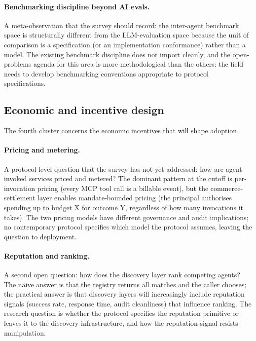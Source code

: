 \paragraph{Benchmarking discipline beyond AI evals.}
A meta-observation that the survey should record:
the inter-agent benchmark space is structurally
different from the LLM-evaluation space because
the unit of comparison is a specification (or an
implementation conformance) rather than a model. The
existing benchmark discipline does not import cleanly,
and the open-problems agenda for this area is more
methodological than the others: the field needs to
develop benchmarking conventions appropriate to
protocol specifications.

\subsection{Economic and incentive design}
\label{sec:openproblems:economic}

The fourth cluster concerns the economic incentives
that will shape adoption.

\paragraph{Pricing and metering.}
A protocol-level question that the survey has
not yet addressed: how are agent-invoked services
priced and metered? The dominant pattern at the
cutoff is per-invocation pricing
(every MCP tool call is a billable event), but
the commerce-settlement layer enables mandate-bounded
pricing (the principal authorises spending up to
budget X for outcome Y, regardless of how many
invocations it takes). The two pricing models
have different governance and audit implications;
no contemporary protocol specifies which model the
protocol assumes, leaving the question to
deployment.

\paragraph{Reputation and ranking.}
A second open question: how does the discovery
layer rank competing agents? The naive answer is
that the registry returns all matches and the
caller chooses; the practical answer is that
discovery layers will increasingly include
reputation signals (success rate, response time,
audit cleanliness) that influence ranking. The
research question is whether the protocol
specifies the reputation primitive or leaves it
to the discovery infrastructure, and how the
reputation signal resists manipulation.

